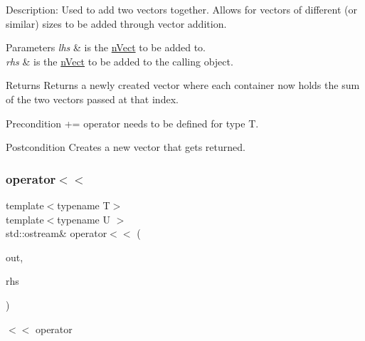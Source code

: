 Description\+: Used to add two vectors together. Allows for vectors of different (or similar) sizes to be added through vector addition. 
\begin{DoxyParams}{Parameters}
{\em lhs} & is the \hyperlink{classnVect}{n\+Vect} to be added to. \\
\hline
{\em rhs} & is the \hyperlink{classnVect}{n\+Vect} to be added to the calling object. \\
\hline
\end{DoxyParams}
\begin{DoxyReturn}{Returns}
Returns a newly created vector where each container now holds the sum of the two vectors passed at that index. 
\end{DoxyReturn}
\begin{DoxyPrecond}{Precondition}
+= operator needs to be defined for type T. 
\end{DoxyPrecond}
\begin{DoxyPostcond}{Postcondition}
Creates a new vector that gets returned. 
\end{DoxyPostcond}
\mbox{\label{classnVect_a6b1efa03bac435bc6ce49d8de18ad3e5}} 
\subsubsection{\texorpdfstring{operator$<$$<$}{operator<<}}
{\footnotesize\ttfamily template$<$typename T$>$ \\
template$<$typename U $>$ \\
std\+::ostream\& operator$<$$<$ (\begin{DoxyParamCaption}\item[{std\+::ostream \&}]{out,  }\item[{const \hyperlink{classnVect}{n\+Vect}$<$ U $>$ \&}]{rhs }\end{DoxyParamCaption})\hspace{0.3cm}{\ttfamily [friend]}}



$<$$<$ operator 

